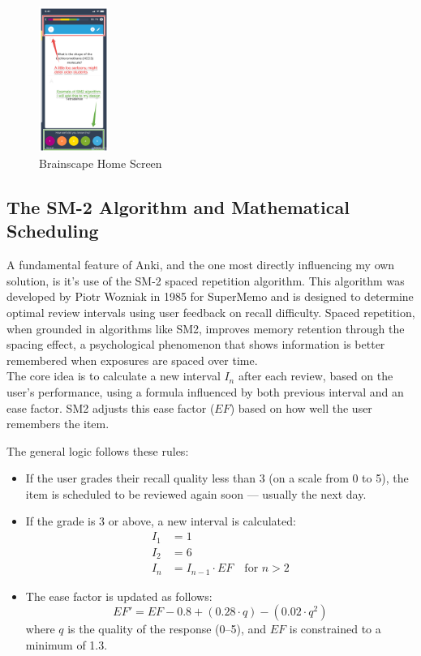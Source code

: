 \documentclass[a4paper,12pt]{article}
\begin{document}
\begin{figure}[H]
  \centering
  \includegraphics[width=0.2\textwidth]{../Screenshots/BrainscapeFlashcard.png}
  \caption{Brainscape Home Screen}
  \label{fig:brainscapehome} %
\end{figure}

\newpage

\subsection{The SM-2 Algorithm and Mathematical Scheduling}

A fundamental feature of Anki, and the one most directly influencing my own solution, is it's use of the SM-2 spaced repetition algorithm. This algorithm was developed by Piotr Wozniak in 1985 for SuperMemo and is designed to determine optimal review intervals using user feedback on recall difficulty. Spaced repetition, when grounded in algorithms like SM2, improves memory retention through the spacing effect, a psychological phenomenon that shows information is better remembered when exposures are spaced over time. \\

The core idea is to calculate a new interval $I_n$ after each review, based on the user's performance, using a formula influenced by both previous interval and an ease factor. SM2 adjusts this ease factor ($EF$) based on how well the user remembers the item. \\

\medskip

The general logic follows these rules:

\begin{itemize}
  \item If the user grades their recall quality less than 3 (on a scale from 0 to 5), the item is scheduled to be reviewed again soon — usually the next day.
  \item If the grade is 3 or above, a new interval is calculated:
    \begin{align*}
      I_1 &= 1 \\
      I_2 &= 6 \\
      I_n &= I_{n-1} \cdot EF \quad \text{for } n > 2
    \end{align*}
  \item The ease factor is updated as follows:
    \[
    EF' = EF - 0.8 + (0.28 \cdot q) - (0.02 \cdot q^2)
    \]
    where $q$ is the quality of the response (0–5), and $EF$ is constrained to a minimum of 1.3.
\end{itemize}
\end{document}
